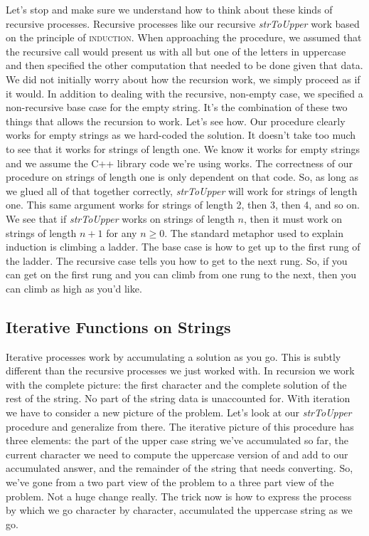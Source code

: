 \documentclass[]{tufte-handout}
\begin{document}
Let's stop and make sure we understand how to think about these kinds of recursive processes.  Recursive processes like our recursive \textit{strToUpper} work based on the principle of \textsc{induction}.  When approaching the procedure, we assumed that the recursive call would present us with all but one of the letters in uppercase and then specified the other computation that needed to be done given that data.  We did not initially worry about how the recursion work, we simply proceed as if it would.  In addition to dealing with the recursive, non-empty case, we specified a non-recursive base case for the empty string.  It's the combination of these two things that allows the recursion to work. Let's see how. Our procedure clearly works for empty strings as we hard-coded the solution.  It doesn't take too much to see that it works for strings of length one.  We know it works for empty strings and we assume the C++ library code we're using works. The correctness of our procedure on strings of length one is only dependent on that code.  So, as long as we glued all of that together correctly, \textit{strToUpper} will work for strings of length one.  This same argument works for strings of length 2, then 3, then 4, and so on.  We see that if \textit{strToUpper} works on strings of length $n$, then it must work on strings of length $n+1$ for any $n\geq0$.  The standard metaphor used to explain induction is climbing a ladder.  The base case is how to get up to the first rung of the ladder.  The recursive case tells you how to get to the next rung.  So, if you can get on the first rung and you can climb from one rung to the next, then you can climb as high as you'd like.


\subsection{Iterative Functions on Strings}

Iterative processes work by accumulating a solution as you go.  This is subtly different than the recursive processes we just worked with.  In recursion we work with the complete picture: the first character and the complete solution of the rest of the string. No part of the string data is unaccounted for.  With iteration we have to consider a new picture of the problem.  Let's look at our \textit{strToUpper} procedure and generalize from there.  The iterative picture of this procedure has three elements: the part of the upper case string we've accumulated so far, the current character we need to compute the uppercase version of and add to our accumulated answer, and the remainder of the string that needs converting.  So, we've gone from a two part view of the problem to a three part view of the problem.  Not a huge change really. The trick now is how to express the process by which we go character by character, accumulated the uppercase string as we go.
\end{document}
